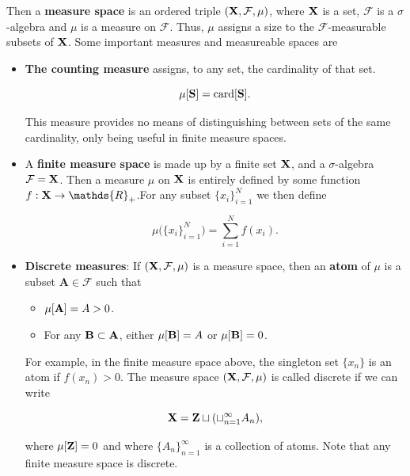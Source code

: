 \documentclass{homework}
\begin{document}
Then a \textbf{measure space} is an ordered triple $({\bf X}, \mathcal{F}, \mu)$, where ${\bf X}$ is a set, $\mathcal{F}$ is a $\sigma$-algebra and $\mu$ is a measure on $\mathcal{F}$. Thus, $\mu$ assigns a size to the $\mathcal{F}$-measurable subsets of ${\bf X}$. Some important measures and measureable spaces are

\begin{itemize}
    \item \textbf{The counting measure} assigns, to any set, the cardinality of that set. 
    
    $$
    \mu[{\bf S}] =\textnormal{card}[{\bf S}].
    $$
    
    This measure provides no means of distinguishing between sets of the same cardinality, only being useful in finite measure spaces. \\
    
    \item A \textbf{finite measure space} is made up by a finite set ${\bf X}$, and a $\sigma$-algebra $\mathcal{F}= {\bf X}$. Then a measure $\mu$ on ${\bf X}$ is entirely defined by some function $f: {\bf X} \rightarrow \mathds{R}_{+}$.For any subset $\{x_i\}_{i=1}^{N}$ we then define 
    
    $$
    \mu\bigg(\{x_i\}_{i=1}^{N}\bigg)= \sum_{i=1}^{N}f(x_i).
    $$
    
    \item \textbf{Discrete measures}: If $({\bf X}, \mathcal{F},\mu)$ is a measure space, then an \textbf{atom} of $\mu$ is a subset $\mathbf{A} \in \mathcal{F}$ such that 
    
    \begin{itemize}
        \item $\mu[{\bf A}] = A > 0$.
        \item For any ${\bf B} \subset {\bf A}$, either $\mu[{\bf B}] = A$ or $\mu[{\bf B}] = 0$.\\
    \end{itemize}
    
    For example, in the finite measure space above, the singleton set $\{x_n\}$ is an atom if $f(x_n) > 0$. The measure space $({\bf X}, \mathcal{F},\mu)$ is called discrete if we can write 
    
    $$
    {\bf X} = {\bf Z} \sqcup (\sqcup_{n=1}^{\infty} A_n),
    $$
    
    where $\mu[{\bf Z}] = 0$ and where $\{A_n\}_{n=1}^{\infty}$ is a collection of atoms. Note that any finite measure space is discrete.  \\
    

\end{itemize}
\end{document}
